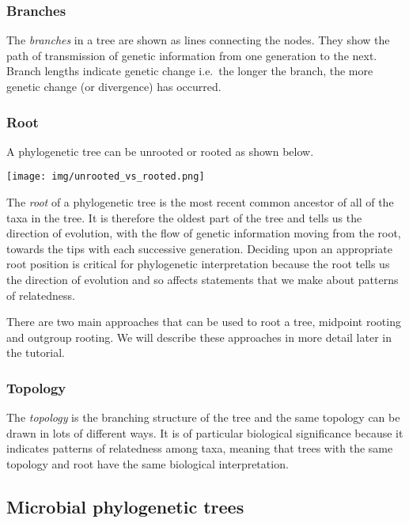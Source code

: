 \documentclass[11pt]{article}
\begin{document}
\hypertarget{branches}{%
\subsubsection{Branches}\label{branches}}

The \textit{branches} in a tree are shown as lines connecting the nodes.
They show the path of transmission of genetic information from one
generation to the next. Branch lengths indicate genetic change i.e.~the
longer the branch, the more genetic change (or divergence) has occurred.

\hypertarget{root}{%
\subsubsection{Root}\label{root}}

A phylogenetic tree can be unrooted or rooted as shown below.


\begin{center}
\texttt{[image: img/unrooted\_vs\_rooted.png]}
\end{center}


The \textit{root} of a phylogenetic tree is the most recent common
ancestor of all of the taxa in the tree. It is therefore the oldest part
of the tree and tells us the direction of evolution, with the flow of
genetic information moving from the root, towards the tips with each
successive generation. Deciding upon an appropriate root position is
critical for phylogenetic interpretation because the root tells us the
direction of evolution and so affects statements that we make about
patterns of relatedness.

There are two main approaches that can be used to root a tree, midpoint
rooting and outgroup rooting. We will describe these approaches in more
detail later in the tutorial.

\hypertarget{topology}{%
\subsubsection{Topology}\label{topology}}

The \textit{topology} is the branching structure of the tree and the same
topology can be drawn in lots of different ways. It is of particular
biological significance because it indicates patterns of relatedness
among taxa, meaning that trees with the same topology and root have the
same biological interpretation.

    \hypertarget{microbial-phylogenetic-trees}{%
\subsection{Microbial phylogenetic
trees}\label{microbial-phylogenetic-trees}}
\end{document}
